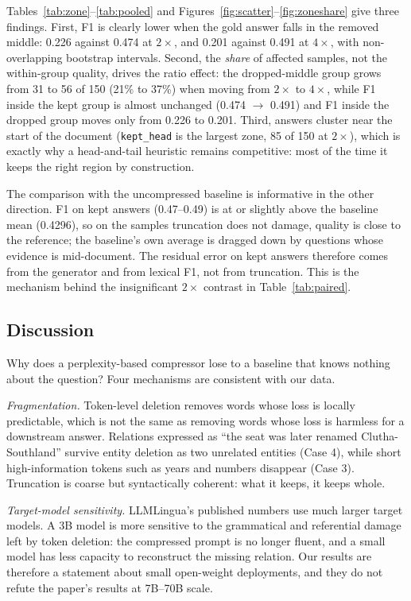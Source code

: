 \documentclass[10pt,a4paper,twocolumn]{article}
\begin{document}
Tables~\ref{tab:zone}--\ref{tab:pooled} and Figures~\ref{fig:scatter}--\ref{fig:zoneshare}
give three findings. First, F1 is clearly lower when the gold answer falls in the
removed middle: 0.226 against 0.474 at $2\times$, and 0.201 against 0.491 at
$4\times$, with non-overlapping bootstrap intervals. Second, the \emph{share} of
affected samples, not the within-group quality, drives the ratio effect: the
dropped-middle group grows from 31 to 56 of 150 (21\% to 37\%) when moving from
$2\times$ to $4\times$, while F1 inside the kept group is almost unchanged
(0.474 $\rightarrow$ 0.491) and F1 inside the dropped group moves only from 0.226
to 0.201. Third, answers cluster near the start of the document
(\texttt{kept\_head} is the largest zone, 85 of 150 at $2\times$), which is exactly
why a head-and-tail heuristic remains competitive: most of the time it keeps the
right region by construction.

The comparison with the uncompressed baseline is informative in the other
direction. F1 on kept answers (0.47--0.49) is at or slightly above the baseline mean
(0.4296), so on the samples truncation does not damage, quality is close to the
reference; the baseline's own average is dragged down by questions whose evidence
is mid-document. The residual error on kept answers therefore comes from the
generator and from lexical F1, not from truncation. This is the mechanism behind
the insignificant $2\times$ contrast in Table~\ref{tab:paired}.

\subsection{Discussion}

Why does a perplexity-based compressor lose to a baseline that knows nothing about
the question? Four mechanisms are consistent with our data.

\emph{Fragmentation.} Token-level deletion removes words whose loss is locally
predictable, which is not the same as removing words whose loss is harmless for a
downstream answer. Relations expressed as ``the seat was later renamed
Clutha-Southland'' survive entity deletion as two unrelated entities (Case 4),
while short high-information tokens such as years and numbers disappear (Case 3).
Truncation is coarse but syntactically coherent: what it keeps, it keeps whole.

\emph{Target-model sensitivity.} LLMLingua's published numbers use much larger
target models. A 3B model is more sensitive to the grammatical and referential
damage left by token deletion: the compressed prompt is no longer fluent, and a
small model has less capacity to reconstruct the missing relation. Our results are
therefore a statement about small open-weight deployments, and they do not refute
the paper's results at 7B--70B scale.
\end{document}

